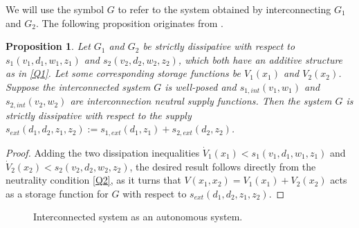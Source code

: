 \documentclass[11pt,a4paper,oneside,DIV=12,headings=small]{scrartcl}
\newtheorem{proposition}[theorem]{Proposition}
\theoremstyle{plain}
\begin{document}
We will use the symbol $G$ to refer to the system obtained by interconnecting $G_1$ and $G_2$.
The following proposition originates from \cite{Willems_1}.  
\begin{proposition}
\label{Prop1}
Let $G_1$ and $G_2$ be strictly dissipative with respect to $s_1(v_1,d_1,w_1,z_1)$ and $s_2(v_2,d_2,w_2,z_2)$, which both have an additive structure as in \eqref{Q1}. Let some corresponding storage functions be $V_1(x_1)$ and $V_2(x_2)$. Suppose the interconnected system $G$ is well-posed and $s_{1,int}(v_1,w_1)$ and $s_{2,int}(v_2,w_2)$ are interconnection neutral supply functions. Then the system $G$ is strictly dissipative with respect to the supply $s_{ext}(d_1,d_2,z_1,z_2):=s_{1,ext}(d_1,z_1)+s_{2,ext}(d_2,z_2)$.      
\end{proposition} 
\begin{proof}Adding the two dissipation inequalities $\dot{V}_1(x_1) < s_1(v_1,d_1,w_1,z_1)$ and $\dot{V}_2(x_2) < s_2(v_2,d_2,w_2,z_2)$, the desired result follows directly from the neutrality condition \eqref{Q2}, as it turns that $V(x_1,x_2)=V_1(x_1)+V_2(x_2)$ acts as a storage function for $G$ with respect to $s_{ext}(d_1,d_2,z_1,z_2)$.
\end{proof}
\begin{figure}[h!]
\centering
\caption{Interconnected system as an autonomous system.}
\label{StructuredClosed}
\end{figure}
\end{document}
